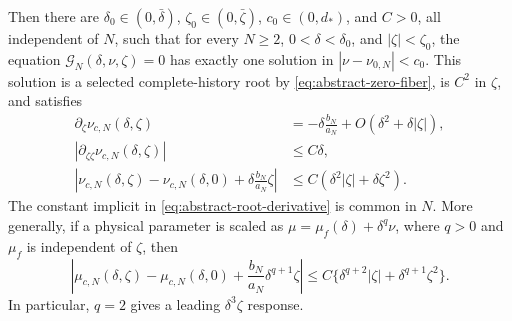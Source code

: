 \begin{theorem}
Then there are \(\delta_0\in(0,\bar\delta)\),
\(\zeta_0\in(0,\bar\zeta)\), \(c_0\in(0,d_*)\), and \(C>0\), all
independent of \(N\), such that for every \(N\ge2\),
\(0<\delta<\delta_0\), and \(|\zeta|<\zeta_0\), the equation
\(\mathscr G_N(\delta,\nu,\zeta)=0\) has exactly one solution in
\(|\nu-\nu_{0,N}|<c_0\).  This solution is a selected complete-history
root by \cref{eq:abstract-zero-fiber}, is \(C^2\) in \(\zeta\), and
satisfies
\begin{align}
 \partial_\zeta\nu_{c,N}(\delta,\zeta)
 &=-\delta\frac{b_N}{a_N}
   +O(\delta^2+\delta|\zeta|),
 \label{eq:abstract-root-derivative}\\
 |\partial_{\zeta\zeta}\nu_{c,N}(\delta,\zeta)|
 &\le C\delta,
 \label{eq:abstract-root-second-derivative}\\
 \left|\nu_{c,N}(\delta,\zeta)-\nu_{c,N}(\delta,0)
       +\delta\frac{b_N}{a_N}\zeta\right|
 &\le C(\delta^2|\zeta|+\delta\zeta^2).
 \label{eq:abstract-root-increment}
\end{align}
The constant implicit in \cref{eq:abstract-root-derivative} is common in
\(N\).  More generally, if a physical parameter is scaled as
\(\mu=\mu_f(\delta)+\delta^q\nu\), where \(q>0\) and \(\mu_f\) is
independent of \(\zeta\), then
\begin{equation}
 \left|\mu_{c,N}(\delta,\zeta)-\mu_{c,N}(\delta,0)
       +\frac{b_N}{a_N}\delta^{q+1}\zeta\right|
 \le C\{\delta^{q+2}|\zeta|+\delta^{q+1}\zeta^2\}.
 \label{eq:abstract-physical-increment}
\end{equation}
In particular, \(q=2\) gives a leading \(\delta^3\zeta\) response.
\end{theorem}

